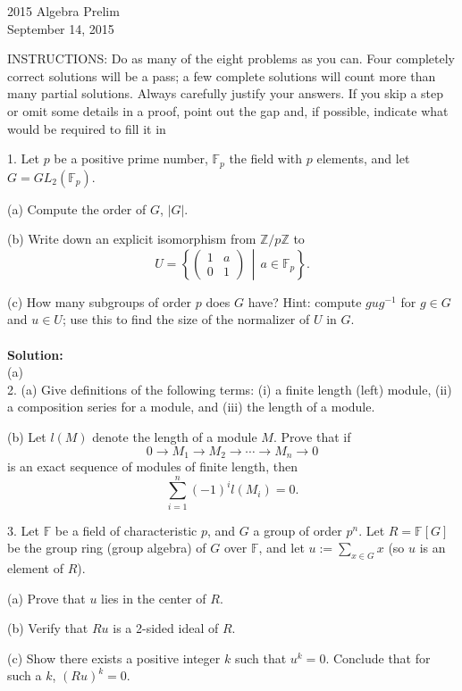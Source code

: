 \documentclass[11pt]{article}
\newcommand{\Z}{\mathbb{Z}}
\newcommand{\F}{\mathbb{F}}
\begin{document}
\begin{center}
\Large 2015 Algebra Prelim\\
\normalsize September 14, 2015
\end{center}
\vspace{1em}

INSTRUCTIONS: Do as many of the eight problems as you can. Four completely
correct solutions will be a pass; a few complete solutions will count more than many
partial solutions. Always carefully justify your answers. If you skip a step or omit
some details in a proof, point out the gap and, if possible, indicate what would be
required to fill it in\\
\vspace{1em}

1. Let $p$ be a positive prime number, $\F_p$ the field with $p$ elements, and let $G = GL_2(\F_p)$.

(a) Compute the order of $G$, $|G|$.

(b) Write down an explicit isomorphism from $\Z/p\Z$ to\[
U = \left\{ \begin{pmatrix}1&a\\0&1\end{pmatrix}\,\middle| \, a\in \F_p\right\}.
\]

(c) How many subgroups of order $p$ does $G$ have?
Hint: compute $gug^{-1}$
for $g \in G$ and $u\in U$; use this to find the size of the
normalizer of $U$ in $G$.\\\\
\textbf{Solution:}\\
(a)\\


2. (a) Give definitions of the following terms: (i) a finite length (left) module, (ii) a
composition series for a module, and (iii) the length of a module.


(b) Let $l(M)$ denote the length of a module $M$. Prove that if\[
0 \to M_1\to M_2\to \cdots \to M_n\to 0
\]
is an exact sequence of modules of finite length, then\[
\sum_{i=1}^n(-1)^il(M_i) = 0.
\]

3. Let $\F$ be a field of characteristic $p$, and $G$ a group of order $p^n$. Let $R = \F[G]$ be the
group ring (group algebra) of $G$ over $\F$, and let $u := \sum_{x\in G} x$ (so $u$ is an element of $R$).

(a) Prove that $u$ lies in the center of $R$.

(b) Verify that $Ru$ is a 2-sided ideal of $R$.

(c) Show there exists a positive integer $k$ such that $u^k = 0$. Conclude that for such a $k$, $(Ru)^k = 0$.
\end{document}
